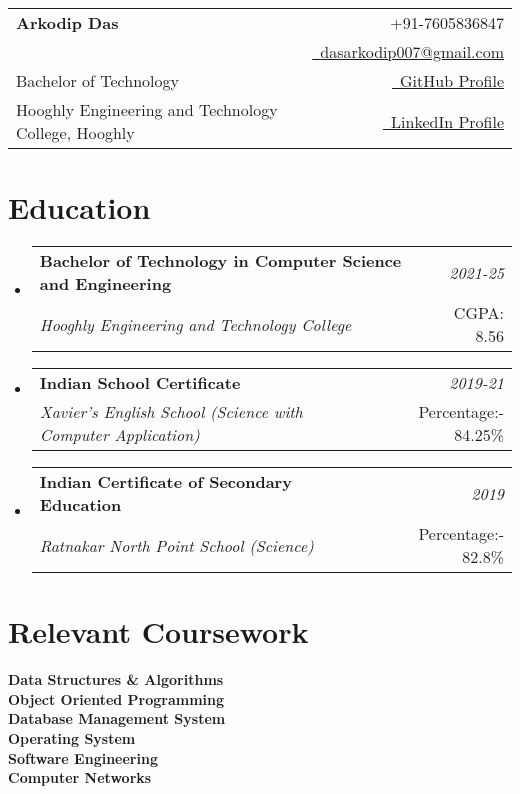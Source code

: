 \documentclass[a4paper,11pt]{article}
\makeatletter
\newcommand{\resumeSubheading}[4]{
\vspace{0.5mm}\item
    \begin{tabular*}{0.98\textwidth}[t]{l@{\extracolsep{\fill}}r}
        \textbf{#1} & \textit{\footnotesize{#4}} \\
        \textit{\footnotesize{#3}} &  \footnotesize{#2}\\
    \end{tabular*}
    \vspace{-2.4mm}
}
\newcommand{\resumeSubHeadingListStart}{\begin{itemize}[leftmargin=*,labelsep=0mm]}
\newcommand{\resumeSubHeadingListEnd}{\end{itemize}\vspace{2mm}}
\newcommand{\name}{Arkodip Das} %
\newcommand{\phone}{7605836847} %
\newcommand{\emaila}{dasarkodip007@gmail.com} %
\makeatother
\begin{document}
\selectfont

{
\begin{tabularx}{\linewidth}{L r} \\
  \textbf{\Large \name} & {\raisebox{0.0\height}{\footnotesize \faPhone}\ +91-\phone}\\
   & \href{mailto:\emaila}{\raisebox{0.0\height}{\footnotesize \faEnvelope}\ {\emaila}} \\
  Bachelor of Technology & \href{https://github.com/arkodipdas}{\raisebox{0.0\height}{\footnotesize \faGithub}\ {GitHub Profile}} \\  
  {Hooghly Engineering and Technology College, Hooghly} & \href{www.linkedin.com/in/xxxx/}{\raisebox{0.0\height}{\footnotesize \faLinkedin}\ {LinkedIn Profile}}
\end{tabularx}
}


\section{\textbf{Education}}
  \resumeSubHeadingListStart
    \resumeSubheading
      {Bachelor of Technology in Computer Science and Engineering}{CGPA: 8.56}
      {Hooghly Engineering and Technology College}{2021-25}
  \resumeSubHeadingListEnd
\vspace{-5.5mm}
 \resumeSubHeadingListStart
    \resumeSubheading
      {Indian School Certificate}{Percentage:- 84.25\%}
      {Xavier's English School (Science with Computer Application)}{2019-21}
  \resumeSubHeadingListEnd
\vspace{-5.5mm}
 \resumeSubHeadingListStart
    \resumeSubheading
      {Indian Certificate of Secondary Education  }{Percentage:- 82.8\%}
      {Ratnakar North Point School (Science)}{2019}
  \resumeSubHeadingListEnd
\vspace{-5.5mm}
%
\section{\textbf{Relevant Coursework}}
 \begin{itemize}[leftmargin=0.05in, label={}]
    \small{\item{
 \textbf{Data Structures \& Algorithms }{} \\  
     \textbf{Object Oriented Programming}{} \\
    \textbf{Database Management System}{ } \\ 
     \textbf{Operating System }{}\\ 
 
\textbf{Software Engineering} \\
     \textbf{Computer Networks} \\
    }}
 \end{itemize}
 \vspace{-16pt}
\end{document}
